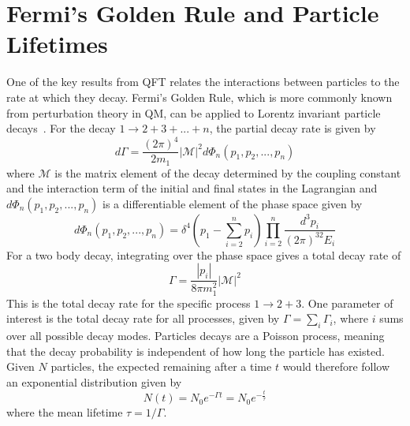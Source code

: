 \section{Fermi's Golden Rule and Particle Lifetimes}
One of the key results from QFT relates the interactions between particles to the rate at which they decay. Fermi's Golden Rule, which is more commonly known from perturbation theory in QM, can be applied to Lorentz invariant particle decays~\cite{pdg2024}. For the decay $1\to2+3+...+n$, the partial decay rate is given by
\begin{equation}
	d\Gamma=\frac{(2\pi)^4}{2m_1}|\mathcal{M}|^2d\Phi_n(p_1,p_2,...,p_n)
\end{equation}
where $\mathcal{M}$ is the matrix element of the decay determined by the coupling constant and the interaction term of the initial and final states in the Lagrangian and $d\Phi_n(p_1,p_2,...,p_n)$ is a differentiable element of the phase space given by
\begin{equation}
	d\Phi_n(p_1,p_2,...,p_n)=\delta^4(p_1-\sum_{i=2}^n p_i)\prod_{i=2}^n\frac{d^3p_i}{(2\pi)^32E_i}
\end{equation}
For a two body decay, integrating over the phase space gives a total decay rate of
\begin{equation}
	\Gamma=\frac{|p_i|}{8\pi m_1^2}|\mathcal{M}|^2
\end{equation}
This is the total decay rate for the specific process $1\to2+3$. One parameter of interest is the total decay rate for all processes, given by $\Gamma=\sum_{i}\Gamma_i$, where $i$ sums over all possible decay modes. Particles decays are a Poisson process, meaning that the decay probability is independent of how long the particle has existed. Given $N$ particles, the expected remaining after a time $t$ would therefore follow an exponential distribution given by
\begin{equation}
	N(t)=N_0e^{-\Gamma t}=N_0e^{-\frac{t}{\tau}}
\end{equation}
where the mean lifetime $\tau=1/\Gamma$.

